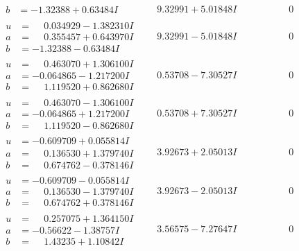\documentclass[1p]{elsarticle_modified}
\theoremstyle{definition}
\begin{document}
$$\begin{array}{c|c|c}
\begin{aligned}
b &= -1.32388 + 0.63484 I\end{aligned}
 & \phantom{-}9.32991 + 5.01848 I & \phantom{-0.000000 } 0 \\ \hline\begin{aligned}
u &= \phantom{-}0.034929 - 1.382310 I \\
a &= \phantom{-}0.355457 + 0.643970 I \\
b &= -1.32388 - 0.63484 I\end{aligned}
 & \phantom{-}9.32991 - 5.01848 I & \phantom{-0.000000 } 0 \\ \hline\begin{aligned}
u &= \phantom{-}0.463070 + 1.306100 I \\
a &= -0.064865 - 1.217200 I \\
b &= \phantom{-}1.119520 + 0.862680 I\end{aligned}
 & \phantom{-}0.53708 - 7.30527 I & \phantom{-0.000000 } 0 \\ \hline\begin{aligned}
u &= \phantom{-}0.463070 - 1.306100 I \\
a &= -0.064865 + 1.217200 I \\
b &= \phantom{-}1.119520 - 0.862680 I\end{aligned}
 & \phantom{-}0.53708 + 7.30527 I & \phantom{-0.000000 } 0 \\ \hline\begin{aligned}
u &= -0.609709 + 0.055814 I \\
a &= \phantom{-}0.136530 + 1.379740 I \\
b &= \phantom{-}0.674762 - 0.378146 I\end{aligned}
 & \phantom{-}3.92673 + 2.05013 I & \phantom{-0.000000 } 0 \\ \hline\begin{aligned}
u &= -0.609709 - 0.055814 I \\
a &= \phantom{-}0.136530 - 1.379740 I \\
b &= \phantom{-}0.674762 + 0.378146 I\end{aligned}
 & \phantom{-}3.92673 - 2.05013 I & \phantom{-0.000000 } 0 \\ \hline\begin{aligned}
u &= \phantom{-}0.257075 + 1.364150 I \\
a &= -0.56622 - 1.38757 I \\
b &= \phantom{-}1.43235 + 1.10842 I\end{aligned}
 & \phantom{-}3.56575 - 7.27647 I & \phantom{-0.000000 } 0 \\ \hline\begin{aligned}

\end{aligned}
\end{array}$$
\end{document}
